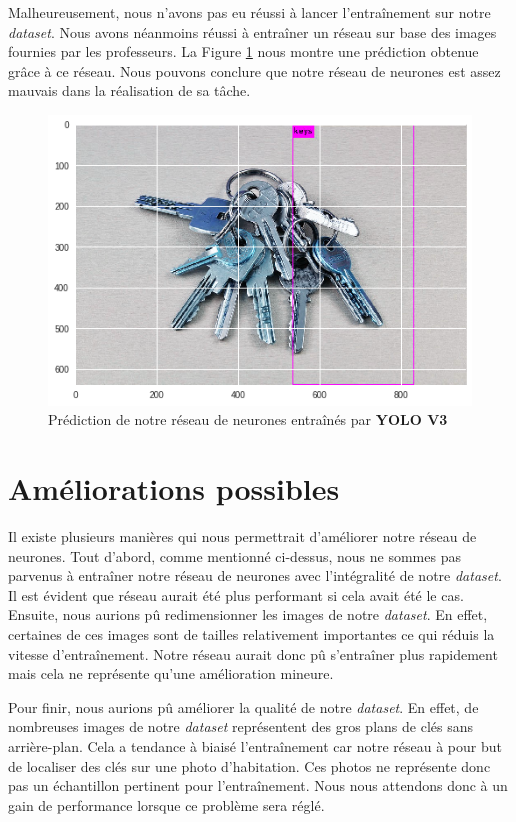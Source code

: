 \documentclass[10pt,a4paper]{article}
\begin{document}
   		Malheureusement, nous n'avons pas eu réussi à lancer l'entraînement sur notre \textit{dataset}. Nous avons néanmoins réussi à entraîner un réseau sur base des images fournies par les professeurs. La Figure \ref{fig:pred} nous montre une prédiction obtenue grâce à ce réseau. Nous pouvons conclure que notre réseau de neurones est assez mauvais dans la réalisation de sa tâche.
   		
   		\begin{figure}[h]
			\begin{center}
	   			\includegraphics[width=0.5\linewidth]{pred}
	   			\caption{Prédiction de notre réseau de neurones entraînés par \textbf{YOLO V3}}
	   			\label{fig:pred}
			\end{center}
   		\end{figure}
   	
   	\section{Améliorations possibles}
   	
   		Il existe plusieurs manières qui nous permettrait d'améliorer notre réseau de neurones.   		
   		Tout d'abord, comme mentionné ci-dessus, nous ne sommes pas parvenus à entraîner notre réseau de neurones avec l'intégralité de notre \textit{dataset}. Il est évident que réseau aurait été plus performant si cela avait été le cas.\\
   		
   		Ensuite, nous aurions pû redimensionner les images de notre \textit{dataset}. En effet, certaines de ces images sont de tailles relativement importantes ce qui réduis la vitesse d'entraînement. Notre réseau aurait donc pû s'entraîner plus rapidement mais cela ne représente qu'une amélioration mineure.
   		
   		Pour finir, nous aurions pû améliorer la qualité de notre \textit{dataset}. En effet, de nombreuses images de notre \textit{dataset} représentent des gros plans de clés sans arrière-plan. Cela a tendance à biaisé l'entraînement car notre réseau à pour but de localiser des clés sur une photo d'habitation. Ces photos ne représente donc pas un échantillon pertinent pour l'entraînement. Nous nous attendons donc à un gain de performance lorsque ce problème sera réglé.
          	
\end{document}
